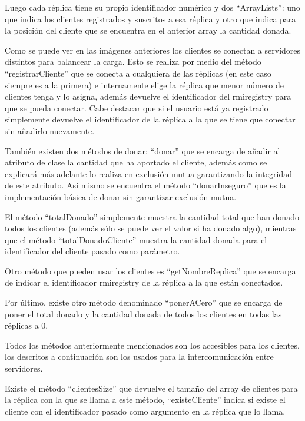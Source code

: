 \documentclass{article}
\begin{document}
Luego cada réplica tiene su propio identificador numérico y dos ``ArrayLists'': uno que indica los clientes registrados y suscritos a esa réplica y otro que indica para la posición del cliente que se encuentra en el anterior array la cantidad donada.


Como se puede ver en las imágenes anteriores los clientes se conectan a servidores distintos para balancear la carga. Esto se realiza por medio del método ``registrarCliente'' que se conecta a cualquiera de las réplicas (en este caso siempre es a la primera) e internamente elige la réplica que menor número de clientes tenga y lo asigna, además devuelve el identificador del rmiregistry para que se pueda conectar. Cabe destacar que si el usuario está ya registrado simplemente devuelve el identificador de la réplica a la que se tiene que conectar sin añadirlo nuevamente.

También existen dos métodos de donar: ``donar'' que se encarga de añadir al atributo de clase la cantidad que ha aportado el cliente, además como se explicará más adelante lo realiza en exclusión mutua garantizando la integridad de este atributo. Así mismo se encuentra el método ``donarInseguro'' que es la implementación básica de donar sin garantizar exclusión mutua.

El método ``totalDonado'' simplemente muestra la cantidad total que han donado todos los clientes (además sólo se puede ver el valor si ha donado algo), mientras que el método ``totalDonadoCliente'' muestra la cantidad donada para el identificador del cliente pasado como parámetro.

Otro método que pueden usar los clientes es ``getNombreReplica'' que se encarga de indicar el identificador rmiregistry de la réplica a la que están conectados.

Por último, existe otro método denominado ``ponerACero'' que se encarga de poner el total donado y la cantidad donada de todos los clientes en todas las réplicas a 0.

Todos los métodos anteriormente mencionados son los accesibles para los clientes, los descritos a continuación son los usados para la intercomunicación entre servidores.

Existe el método ``clientesSize'' que devuelve el tamaño del array de clientes para la réplica con la que se llama a este método, ``existeCliente'' indica si existe el cliente con el identificador pasado como argumento en la réplica que lo llama. 
\end{document}
